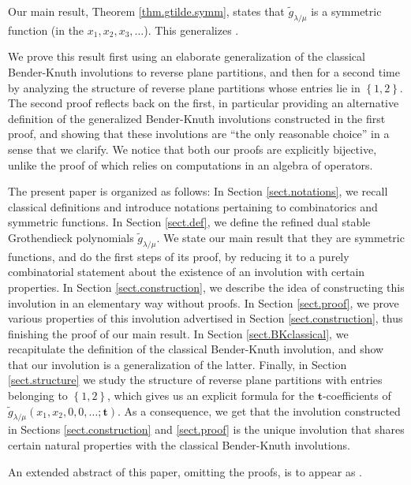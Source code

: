 \documentclass[numbers=enddot,12pt,final,onecolumn,notitlepage]{scrartcl}%
\theoremstyle{definition}
\def\g{{\widetilde{g}}}
\def\t{{\mathbf{t}}}
\def\lm{{\lambda/\mu}}
\begin{document}
Our main result, Theorem \ref{thm.gtilde.symm}, states that
$\widetilde{g}_{\lambda/\mu}$ is a symmetric function (in the $x_{1}%
,x_{2},x_{3},\ldots$). This generalizes \cite[Theorem 9.1]{LamPyl}.

We prove this result first using an elaborate generalization
of the classical Bender-Knuth involutions to reverse plane partitions,
and then for a second time by analyzing the structure of reverse plane
partitions whose entries lie in $\left\{1, 2\right\}$. The second
proof reflects back on the first, in particular providing an
alternative definition of the generalized Bender-Knuth involutions
constructed in the first proof, and showing that these involutions
are ``the only reasonable choice'' in a sense that we clarify.
We notice that both our proofs are explicitly bijective, unlike
the proof of \cite[Theorem 9.1]{LamPyl} which relies on computations
in an algebra of operators.

The present paper is organized as follows: In Section \ref{sect.notations}, we
recall classical definitions and introduce notations pertaining to
combinatorics and symmetric functions. In Section \ref{sect.def}, we define
the refined dual stable Grothendieck polynomials $\widetilde{g}_{\lambda/\mu}$. We state
our main result that they are symmetric functions, and do the first steps of
its proof, by reducing it to a purely combinatorial statement about the
existence of an involution with certain properties. In Section \ref{sect.construction}, we describe the idea of constructing this involution in an elementary way without proofs. In Section
\ref{sect.proof}, we prove various properties of this involution advertised in Section \ref{sect.construction}, thus finishing the proof of our main result. In Section \ref{sect.BKclassical}, we
recapitulate the definition of the classical Bender-Knuth involution, and
show that our involution is a generalization of the latter.
Finally, in Section \ref{sect.structure} we study the structure of
reverse plane partitions with entries belonging to $\left\{1, 2\right\}$,
which gives us an explicit formula for the
$\mathbf{t}$-coefficients of $\g_\lm(x_1,x_2,0,0,\dots;\t)$. As a consequence, we get that the involution constructed in Sections \ref{sect.construction}
and \ref{sect.proof} is the unique involution that shares certain natural properties with the classical Bender-Knuth involutions.

An extended abstract of this paper, omitting the proofs, is to appear
as \cite{GaGrLi16}.
\end{document}
